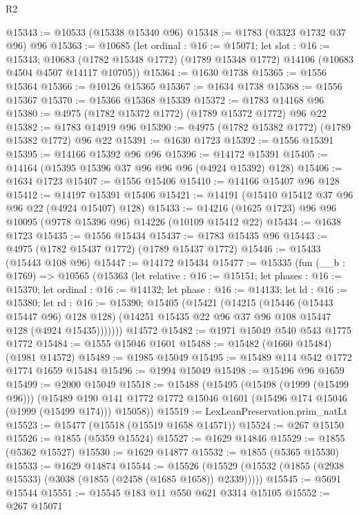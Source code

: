 \begin{lexlean}{R2}
\begin{coremodule}
@15343 := @10533 (@15338 @15340 @96)
@15348 := @1783 (@3323 @1732 @37 @96) @96
@15363 := @10685
    (let ordinal : @16 := @15071;
    let slot : @16 := @15343;
    @10683 (@1782 @15348 @1772) (@1789 @15348 @1772) @14106 (@10683 @4504 @4507 @14117 @10705))
@15364 := @1630 @1738
@15365 := @1556 @15364
@15366 := @10126 @15365
@15367 := @1634 @1738
@15368 := @1556 @15367
@15370 := @15366 @15368 @15339
@15372 := @1783 @14168 @96
@15380 := @4975 (@1782 @15372 @1772) (@1789 @15372 @1772) @96 @22
@15382 := @1783 @14919 @96
@15390 := @4975 (@1782 @15382 @1772) (@1789 @15382 @1772) @96 @22
@15391 := @1630 @1723
@15392 := @1556 @15391
@15395 := @14166 @15392 @96 @96
@15396 := @14172 @15391
@15405 := @14164 (@15395 @15396 @37 @96 @96 @96 (@4924 @15392) @128)
@15406 := @1634 @1723
@15407 := @1556 @15406
@15410 := @14166 @15407 @96 @128
@15412 := @14197 @15391 @15406
@15421 := @14191 (@15410 @15412 @37 @96 @96 @22 (@4924 @15407) @128)
@15433 := @14216 (@1625 @1723) @96 @96 @10095 (@9778 @15396 @96) @14226 (@10109 @15412 @22)
@15434 := @1638 @1723
@15435 := @1556 @15434
@15437 := @1783 @15435 @96
@15443 := @4975 (@1782 @15437 @1772) (@1789 @15437 @1772)
@15446 := @15433 (@15443 @108 @96)
@15447 := @14172 @15434
@15477 := @15335
    (fun (__b : @1769) =>
    @10565
      (@15363
        (let relative : @16 := @15151;
        let phases : @16 := @15370;
        let ordinal : @16 := @14132;
        let phase : @16 := @14133;
        let ld : @16 := @15380;
        let rd : @16 := @15390;
        @15405
          (@15421
            (@14215
              (@15446 (@15443 @15447 @96) @128 @128)
              (@14251 @15435 @22 @96 @37 @96 @108 @15447 @128 (@4924 @15435)))))))
    @14572
@15482 := @1971 @15049 @540 @543 @1775 @1772
@15484 := @1555 @15046 @1601
@15488 := @15482 (@1660 @15484) (@1981 @14572)
@15489 := @1985 @15049
@15495 := @15489 @114 @542 @1772 @1774 @1659 @15484
@15496 := @1994 @15049
@15498 := @15496 @96 @1659
@15499 := @2000 @15049
@15518 := @15488
    (@15495
      (@15498 (@1999 (@15499 @96)))
      (@15489 @190 @141 @1772 @1772 @15046 @1601 (@15496 @174 @15046 (@1999 (@15499 @174))) @15058))
@15519 := LexLeanPreservation.prim_natLt
@15523 := @15477 (@15518 (@15519 @1658 @14571))
@15524 := @267 @15150
@15526 := @1855 (@5359 @15524)
@15527 := @1629 @14846
@15529 := @1855 (@5362 @15527)
@15530 := @1629 @14877
@15532 := @1855 (@5365 @15530)
@15533 := @1629 @14874
@15544 := @15526
    (@15529 (@15532 (@1855 (@2938 @15533) (@3038 (@1855 (@2458 (@1685 @1658)) @2339)))))
@15545 := @5691 @15544
@15551 := @15545 @183 @11 @550 @621 @3314 @15105
@15552 := @267 @15071

\end{coremodule}
\end{lexlean}
